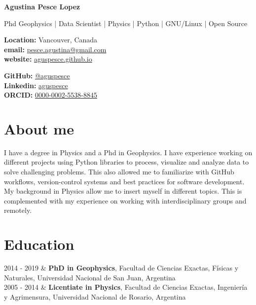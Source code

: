 \documentclass[11pt, a4paper]{article}
\makeatletter
\newcommand{\firstname}{Agustina}
\newcommand{\familyname}{Pesce Lopez}
\newcommand{\email}{pesce.agustina@gmail.com}
\newcommand{\website}{aguspesce.github.io}
\newcommand{\github}{aguspesce}
\newcommand{\linkedin}{aguspesce}
\newcommand{\orcid}{0000-0002-5538-8845}
\newcommand{\fcefn}{Facultad de Ciencias Exactas, Físicas y Naturales}
\newcommand{\unsj}{Universidad Nacional de San Juan}
\newcommand{\fceia}{Facultad de Ciencias Exactas, Ingeniería y Agrimensura}
\newcommand{\unr}{Universidad Nacional de Rosario}
\newcommand{\fullname}{\firstname{} \familyname}
\newcommand{\maintitle}[1]{
    \begin{center}
        \textbf{\Huge #1}
    \end{center}
}
\newcommand{\subtitle}[1]{
    \begin{center}
        {\large #1}
    \end{center}
}
\newcommand{\affiliation}[1]{
    \begin{center}
        {#1}
    \end{center}
}
\newcommand{\entriespad}{0.75em}
\newcommand{\education}[3]{%
    {#1} & {{\bf \large#2}, {#3}} \vspace{\entriespad} \\}
\newcommand{\MAIL}[1]{\href{mailto:#1}{#1}}
\newcommand{\GITHUB}[1]{\href{https://github.com/#1}{@#1}}
\newcommand{\ORCID}[1]{\href{https://orcid.org/#1}{#1}}
\newcommand{\WEBSITE}[1]{\href{https://#1}{#1}}
\newcommand{\LINKEDIN}[1]{\href{https://linkeding.com/#1}{#1}}
\makeatother
\begin{document}
\maintitle{\fullname}
\subtitle{Phd Geophysics | Data Scientist | Physics | Python | GNU/Linux | Open
Source}
\vspace{\entriespad}

\begin{minipage}[t]{0.60\linewidth}
    \begin{flushleft}
        \textbf{Location:} Vancouver, Canada
        \\
        \textbf{email:} \MAIL{\email}
        \\
        \textbf{website:} \WEBSITE{\website}
    \end{flushleft}
\end{minipage}
\hfill
\begin{minipage}[t]{0.40\linewidth}
    \begin{flushright}
        \textbf{GitHub:} \GITHUB{\github}
        \\
        \textbf{Linkedin:} \LINKEDIN{\linkedin}
        \\
        \textbf{ORCID:} \ORCID{\orcid}
    \end{flushright}
\end{minipage}

\vspace{\entriespad}


\section{About me}

I have a degree in Physics and a Phd in Geophysics.
I have experience working on different projects using Python libraries to
process, visualize and analyze data to solve challenging problems.
This also allowed me to familiarize with GitHub workflows, version-control
systems and best practices for software development.
My background in Physics allow me to insert myself in different topics.
This is complemented with my experience on working with interdisciplinary groups
and remotely.


\section{Education}

\begin{cventries}
    \education{2014 - 2019}{PhD in Geophysics}{\fcefn, \unsj, Argentina}
    \education{2005 - 2014}{Licentiate in Physics}{\fceia, \unr, Argentina}
\end{cventries}
\end{document}

